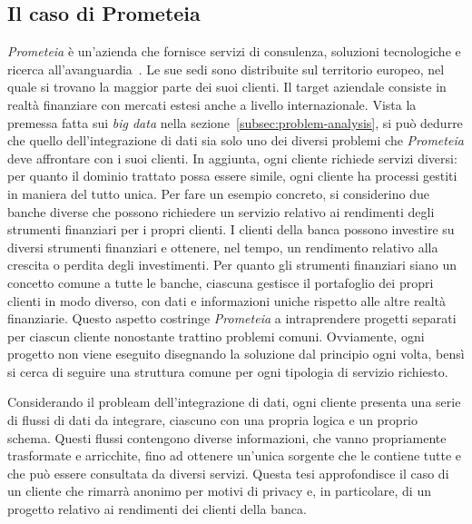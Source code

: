\subsection{Il caso di Prometeia}\label{subsec:problem-prometeia}
\textit{Prometeia} è un'azienda che fornisce servizi di consulenza, soluzioni tecnologiche e ricerca all'avanguardia~\cite{Prometeia-aboutus}.
Le sue sedi sono distribuite sul territorio europeo, nel quale si trovano la maggior parte dei suoi clienti.
Il target aziendale consiste in realtà finanziare con mercati estesi anche a livello internazionale.
Vista la premessa fatta sui \textit{big data} nella sezione~\ref{subsec:problem-analysis}, si può dedurre che quello dell'integrazione di dati sia solo uno dei diversi problemi che \textit{Prometeia} deve affrontare con i suoi clienti.
In aggiunta, ogni cliente richiede servizi diversi: per quanto il dominio trattato possa essere simile, ogni cliente ha processi gestiti in maniera del tutto unica.
Per fare un esempio concreto, si considerino due banche diverse che possono richiedere un servizio relativo ai rendimenti degli strumenti finanziari per i propri clienti.
I clienti della banca possono investire su diversi strumenti finanziari e ottenere, nel tempo, un rendimento relativo alla crescita o perdita degli investimenti.
Per quanto gli strumenti finanziari siano un concetto comune a tutte le banche, ciascuna gestisce il portafoglio dei propri clienti in modo diverso, con dati e informazioni uniche rispetto alle altre realtà finanziarie.
Questo aspetto costringe \textit{Prometeia} a intraprendere progetti separati per ciascun cliente nonostante trattino problemi comuni.
Ovviamente, ogni progetto non viene eseguito disegnando la soluzione dal principio ogni volta, bensì si cerca di seguire una struttura comune per ogni tipologia di servizio richiesto.

Considerando il probleam dell'integrazione di dati, ogni cliente presenta una serie di flussi di dati da integrare, ciascuno con una propria logica e un proprio schema.
Questi flussi contengono diverse informazioni, che vanno propriamente trasformate e arricchite, fino ad ottenere un'unica sorgente che le contiene tutte e che può essere consultata da diversi servizi.
Questa tesi approfondisce il caso di un cliente che rimarrà anonimo per motivi di privacy e, in particolare, di un progetto relativo ai rendimenti dei clienti della banca.

